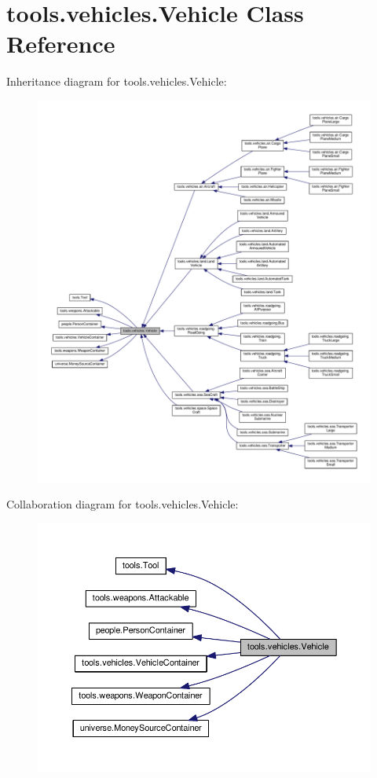 \hypertarget{classtools_1_1vehicles_1_1_vehicle}{}\section{tools.\+vehicles.\+Vehicle Class Reference}
\label{classtools_1_1vehicles_1_1_vehicle}


Inheritance diagram for tools.\+vehicles.\+Vehicle\+:\nopagebreak
\begin{figure}[H]
\begin{center}
\leavevmode
\includegraphics[width=350pt]{classtools_1_1vehicles_1_1_vehicle__inherit__graph}
\end{center}
\end{figure}


Collaboration diagram for tools.\+vehicles.\+Vehicle\+:\nopagebreak
\begin{figure}[H]
\begin{center}
\leavevmode
\includegraphics[width=350pt]{classtools_1_1vehicles_1_1_vehicle__coll__graph}
\end{center}
\end{figure}
